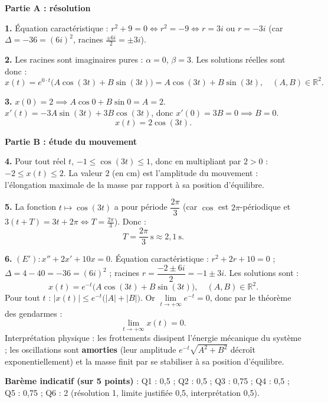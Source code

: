 \documentclass[11pt]{article}
\newcommand{\cle}[1]{{\popxbold\color{popdark}#1}}
\begin{document}
\begin{corrige}
\textbf{Partie A : résolution}

\textbf{1.} Équation caractéristique : $r^2 + 9 = 0 \iff r^2 = -9 \iff r = 3i$ ou $r = -3i$ (car $\Delta = -36 = (6i)^2$, racines $\frac{\pm 6i}{2} = \pm 3i$).

\textbf{2.} Les racines sont imaginaires pures : $\alpha = 0$, $\beta = 3$. Les solutions réelles sont donc :
\[ x(t) = e^{0 \cdot t}\bigl(A\cos(3t) + B\sin(3t)\bigr) = A\cos(3t) + B\sin(3t),\quad (A,B) \in \mathbb{R}^2. \]

\textbf{3.} $x(0) = 2 \implies A\cos 0 + B\sin 0 = A = 2$.
$x'(t) = -3A\sin(3t) + 3B\cos(3t)$, donc $x'(0) = 3B = 0 \implies B = 0$.
\[ \boxed{x(t) = 2\cos(3t).} \]

\textbf{Partie B : étude du mouvement}

\textbf{4.} Pour tout réel $t$, $-1 \leq \cos(3t) \leq 1$, donc en multipliant par $2 > 0$ : $-2 \leq x(t) \leq 2$. La valeur $2$ (en cm) est l'\cle{amplitude} du mouvement : l'élongation maximale de la masse par rapport à sa position d'équilibre.

\textbf{5.} La fonction $t \mapsto \cos(3t)$ a pour période $\dfrac{2\pi}{3}$ (car $\cos$ est $2\pi$-périodique et $3(t + T) = 3t + 2\pi \iff T = \frac{2\pi}{3}$). Donc :
\[ \boxed{T = \frac{2\pi}{3}\ \text{s} \approx 2{,}1\ \text{s}.} \]

\textbf{6.} $(E') : x'' + 2x' + 10x = 0$. Équation caractéristique : $r^2 + 2r + 10 = 0$ ; $\Delta = 4 - 40 = -36 = (6i)^2$ ; racines $r = \dfrac{-2 \pm 6i}{2} = -1 \pm 3i$.
Les solutions sont :
\[ \boxed{x(t) = e^{-t}\bigl(A\cos(3t) + B\sin(3t)\bigr),\quad (A,B) \in \mathbb{R}^2.} \]
Pour tout $t$ : $|x(t)| \leq e^{-t}\bigl(|A| + |B|\bigr)$. Or $\lim\limits_{t \to +\infty} e^{-t} = 0$, donc par le théorème des gendarmes :
\[ \boxed{\lim\limits_{t \to +\infty} x(t) = 0.} \]
Interprétation physique : les frottements dissipent l'énergie mécanique du système ; les oscillations sont \textbf{amorties} (leur amplitude $e^{-t}\sqrt{A^2+B^2}$ décroît exponentiellement) et la masse finit par se stabiliser à sa position d'équilibre.

\textbf{Barème indicatif (sur 5 points)} : Q1 : 0,5 ; Q2 : 0,5 ; Q3 : 0,75 ; Q4 : 0,5 ; Q5 : 0,75 ; Q6 : 2 (résolution 1, limite justifiée 0,5, interprétation 0,5).


\end{corrige}
\end{document}
